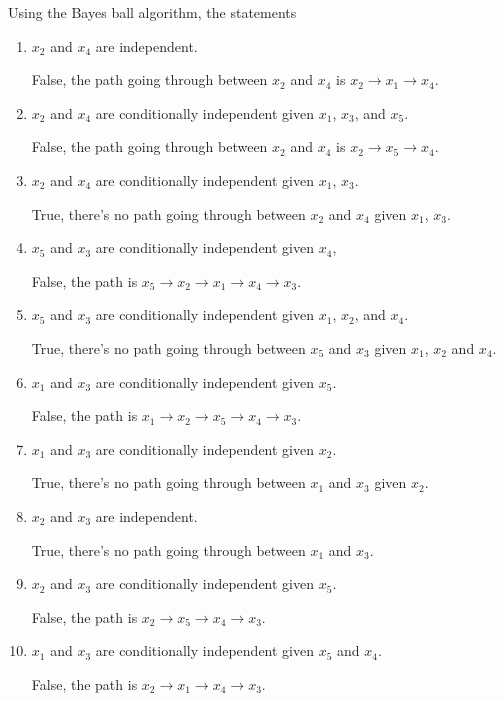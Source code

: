 \documentclass[a4paper,12pt]{article}
\begin{document}
Using the Bayes ball algorithm, the statements
\begin{enumerate}
\item $x_2$ and $x_4$ are independent. 

False, the path going through between $x_2$ and $x_4$ is  $x_2 \to x_1 \to x_4$.

\item $x_2$ and $x_4$ are conditionally independent given $x_1$, $x_3$, and $x_5$.

False, the path going through between $x_2$ and $x_4$ is $x_2 \to x_5 \to x_4$.

\item $x_2$ and $x_4$ are conditionally independent given $x_1$, $x_3$.

True, there's no path going through between $x_2$ and $x_4$ given $x_1$, $x_3$.

\item $x_5$ and $x_3$ are conditionally independent given $x_4$,

False, the path is $x_5 \to x_2 \to x_1 \to x_4 \to x_3$.

\item $x_5$ and $x_3$ are conditionally independent given $x_1$, $x_2$, and $x_4$.

True, there's no path going through between $x_5$ and $x_3$ given $x_1$, $x_2$ and $x_4$.

\item $x_1$ and $x_3$ are conditionally independent given $x_5$.

False, the path is $x_1 \to x_2 \to x_5 \to x_4 \to x_3$.

\item $x_1$ and $x_3$ are conditionally independent given $x_2$.

True, there's no path going through between $x_1$ and $x_3$ given $x_2$.

\item $x_2$ and $x_3$ are independent.

True, there's no path going through between $x_1$ and $x_3$.

\item $x_2$ and $x_3$ are conditionally independent given $x_5$.

False, the path is $x_2 \to x_5 \to x_4 \to x_3$.

\item $x_1$ and $x_3$ are conditionally independent given $x_5$ and $x_4$.

False, the path is $x_2 \to x_1 \to x_4 \to x_3$.

\end{enumerate}
\end{document}
